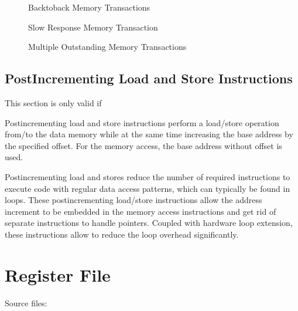 \documentclass[letterpaper,10pt,english]{sphinxmanual}
\begin{document}
\begin{figure}[htbp]
\centering
\capstart

\noindent{}
\caption{Back\sphinxhyphen{}to\sphinxhyphen{}back Memory Transactions}\label{\detokenize{load_store_unit:obi-data-back-to-back}}\end{figure}

\begin{figure}[htbp]
\centering
\capstart

\noindent{}
\caption{Slow Response Memory Transaction}\label{\detokenize{load_store_unit:obi-data-slow-response}}\end{figure}

\begin{figure}[htbp]
\centering
\capstart

\noindent{}
\caption{Multiple Outstanding Memory Transactions}\label{\detokenize{load_store_unit:obi-data-multiple-outstanding}}\end{figure}


\section{Post\sphinxhyphen{}Incrementing Load and Store Instructions}
\label{\detokenize{load_store_unit:post-incrementing-load-and-store-instructions}}
\sphinxAtStartPar
This section is only valid if 

\sphinxAtStartPar
Post\sphinxhyphen{}incrementing load and store instructions perform a load/store
operation from/to the data memory while at the same time increasing the
base address by the specified offset. For the memory access, the base
address without offset is used.

\sphinxAtStartPar
Post\sphinxhyphen{}incrementing load and stores reduce the number of required
instructions to execute code with regular data access patterns, which
can typically be found in loops. These post\sphinxhyphen{}incrementing load/store
instructions allow the address increment to be embedded in the memory
access instructions and get rid of separate instructions to handle
pointers. Coupled with hardware loop extension, these instructions allow
to reduce the loop overhead significantly.

\sphinxstepscope


\chapter{Register File}
\label{\detokenize{register_file:register-file}}\label{\detokenize{register_file:id1}}\label{\detokenize{register_file::doc}}
\sphinxAtStartPar
Source files: 
\end{document}
